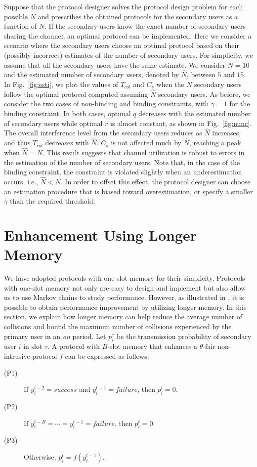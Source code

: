 \documentclass[12pt,draftclsnofoot,onecolumn]{IEEEtran}
\begin{document}
Suppose that the protocol designer solves the protocol design problem
for each possible $N$ and prescribes the obtained protocols for the secondary users as a function of $N$.
If the secondary users know the exact number of secondary users sharing the channel,
an optimal protocol can be implemented. Here we consider a scenario where
the secondary users choose an optimal protocol based on their (possibly incorrect)
estimates of the number of secondary users.
For simplicity, we assume that all the secondary users have the same estimate. We consider $N = 10$ and
the estimated number of secondary users, denoted by $\hat{N}$, between $5$ and $15$.
In Fig.~\ref{fig:esti}, we plot the values of $T_{col}$ and $C_s$
when the $N$ secondary users follow the optimal protocol computed assuming $\hat{N}$ secondary users.
As before, we consider the two cases of non-binding and binding constraints, with $\gamma = 1$ for the binding
constraint. In both cases, optimal $q$ decreases with the estimated number of secondary users
while optimal $r$ is almost constant, as shown in Fig.~\ref{fig:nunc}.
The overall interference level from the secondary users reduces as $\hat{N}$ increases,
and thus $T_{col}$ decreases with $\hat{N}$.
$C_s$ is not affected much by $\hat{N}$, reaching a peak when $\hat{N} = N$.
This result suggests that channel utilization
is robust to errors in the estimation of the number of secondary users.
Note that, in the case of the binding constraint, the constraint is violated slightly when an
underestimation occurs, i.e., $\hat{N} < N$.
In order to offset this effect, the protocol designer can choose an estimation procedure
that is biased toward overestimation, or specify a smaller $\gamma$ than the required threshold.

\section{Enhancement Using Longer Memory}

We have adopted protocols with one-slot memory for their simplicity.
Protocols with one-slot memory not only are easy to design and implement
but also allow us to use Markov chains to study performance.
However, as illustrated in \cite{park}, it is possible to obtain performance improvement
by utilizing longer memory. In this section, we explain how longer memory can
help reduce the average number of collisions
and bound the maximum number of collisions experienced by the primary user in an \emph{on} period.
Let $p_i^{\tau}$ be the transmission probability of secondary user $i$ in slot $\tau$.
A protocol with $B$-slot memory that enhances a $\theta$-fair non-intrusive protocol $f$
can be expressed as follows:
\begin{description}
\item[(P1)] If $y_i^{t-2} = success$ and $y_i^{t-1} = failure$, then $p_i^t = 0$.

\item[(P2)] If $y_i^{t-B} = \cdots = y_i^{t-1} = failure$, then $p_i^t = 0$.

\item[(P3)] Otherwise, $p_i^t = f(y_i^{t-1})$.
\end{description}
\end{document}
